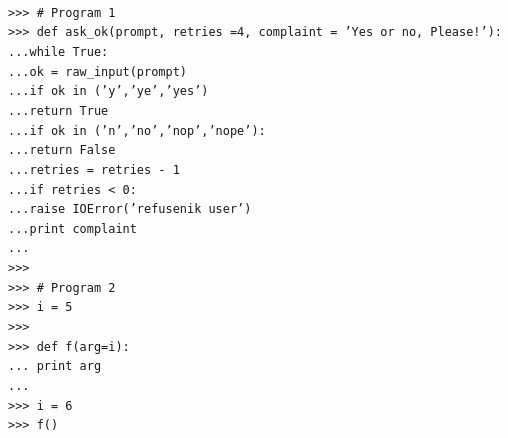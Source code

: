 \documentclass[12pt,a4paper]{article}
\begin{document}
\texttt{\\
>>> \# Program 1\\
>>> def ask\_ok(prompt, retries =4, complaint = 'Yes or no, Please!'):\\
...\hspace{30pt}while True:\\
...\hspace{30pt}\hspace{30pt}ok = raw\_input(prompt)\\
...\hspace{30pt}\hspace{30pt}if ok in ('y','ye','yes')\\
...\hspace{30pt}\hspace{30pt}\hspace{30pt}return True\\
...\hspace{30pt}\hspace{30pt}if ok in ('n','no','nop','nope'):\\
...\hspace{30pt}\hspace{30pt}\hspace{30pt}return False\\
...\hspace{30pt}\hspace{30pt}retries = retries - 1\\
...\hspace{30pt}\hspace{30pt}if retries < 0:\\
...\hspace{30pt}\hspace{30pt}\hspace{30pt}raise IOError('refusenik user')\\
...\hspace{30pt}\hspace{30pt}print complaint\\
...\\
>>> \\
>>> \# Program 2\\
>>> i = 5\\
>>>\\
>>> def f(arg=i):\\
...\hspace{30pt} print arg\\
...\\
>>> i = 6\\
>>> f()\\
}
\end{document}
